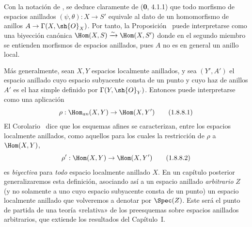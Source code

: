 \begin{env}[1.8.8]
\label{ega2:addendum:I.1.8.8-fr}
Con la notación de , se deduce claramente de
(\textbf 0, 4.1.1) que todo morfismo de espacios anillados
$(\psi,\theta):X\to S'$ equivale al dato de un homomorfismo de
anillos $A\to\Gamma(X,\sh{O}_X)$. Por tanto, la
Proposición~ puede interpretarse como una biyección
canónica
$\Hom(X,S)\xrightarrow{\sim}\Hom(X,S')$
donde en el segundo miembro se entienden morfismos de espacios
anillados, pues $A$ no es en general un anillo local.

Más generalmente, sean $X,Y$ espacios localmente anillados, y sea
$(Y',A')$ el espacio anillado cuyo espacio subyacente consta de un
punto y cuyo haz de anillos $A'$ es el haz simple definido por
$\Gamma(Y,\sh{O}_Y)$. Entonces  puede interpretarse
como una aplicación
\begin{equation}
\label{ega2:addendum:I.1.8.8.1-fr}
  \rho:\Hom_{\mathit{an}}(X,Y)\to\Hom(X,Y')
\tag{1.8.8.1}
\end{equation}
El Corolario~ dice que los esquemas afines se
caracterizan, entre los espacios localmente anillados, como aquellos
para los cuales la restricción de $\rho$ a $\Hom(X,Y)$,
\begin{equation}
\label{ega2:addendum:I.1.8.8.2-fr}
  \rho':\Hom(X,Y)\to\Hom(X,Y')
\tag{1.8.8.2}
\end{equation}
es \emph{biyectiva} para \emph{todo} espacio localmente anillado $X$. En un capítulo
posterior generalizaremos esta definición, asociando así a un espacio
anillado \emph{arbitrario} $Z$ (y no solamente a uno cuyo espacio subyacente
consta de un punto) un espacio localmente anillado que volveremos a
denotar por $\Spec(Z)$. Este será el punto de partida de una teoría
«relativa» de los preesquemas sobre espacios anillados arbitrarios,
que extiende los resultados del Capítulo~I.
\end{env}

